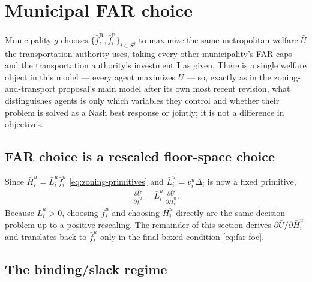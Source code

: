 \documentclass[12pt,a4paper]{article}
\newcommand{\R}{\mathrm{R}}
\newcommand{\F}{\mathrm{F}}
\newcommand{\1}{\mathbb 1}
\begin{document}
\section{Municipal FAR choice}

Municipality $g$ chooses $\{\bar f_i^{\R},\bar f_i^{\F}\}_{i\in S^g}$ to maximize the same metropolitan welfare $\bar U$ the transportation authority uses, taking every other municipality's FAR caps and the transportation authority's investment $\mathbf I$ as given. There is a single welfare object in this model — every agent maximizes $\bar U$ — so, exactly as in the zoning-and-transport proposal's main model after its own most recent revision, what distinguishes agents is only which variables they control and whether their problem is solved as a Nash best response or jointly; it is not a difference in objectives.

\subsection{FAR choice is a rescaled floor-space choice}

Since $\bar H_i^u=\bar L_i^u\bar f_i^u$ \eqref{eq:zoning-primitives} and $\bar L_i^u=v_i^u\Delta_i$ is now a fixed primitive,
\begin{align}
\frac{\partial \bar U}{\partial \bar f_i^u}=\bar L_i^u\,\frac{\partial \bar U}{\partial \bar H_i^u}.
\label{eq:far-chain-rule}
\end{align}
Because $\bar L_i^u>0$, choosing $\bar f_i^u$ and choosing $\bar H_i^u$ directly are the same decision problem up to a positive rescaling. The remainder of this section derives $\partial\bar U/\partial\bar H_i^u$ and translates back to $\bar f_i^u$ only in the final boxed condition \eqref{eq:far-foc}.

\subsection{The binding/slack regime}
\end{document}
